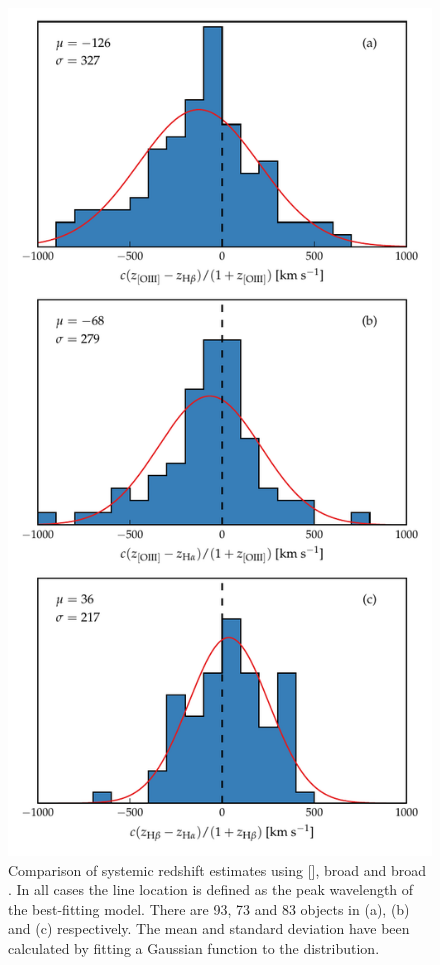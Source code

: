 \begin{figure}
    \centering
    \includegraphics[width=0.8\linewidth]{figures/chapter04/redshift_comparison.pdf} 
    \caption{Comparison of systemic redshift estimates using [], broad \hb and broad \ha. In all cases the line location is defined as the peak wavelength of the best-fitting model. There are 93, 73 and 83 objects in (a), (b) and (c) respectively. The mean and standard deviation have been calculated by fitting a Gaussian function to the distribution.  }       
    \label{fig:redshift_comparison}
\end{figure}

